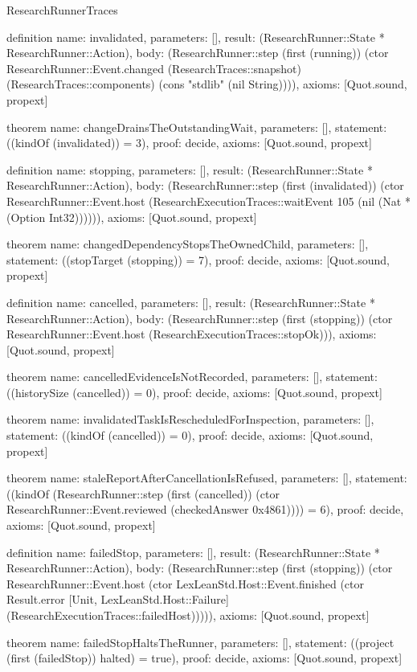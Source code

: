 \begin{lexlean}{ResearchRunnerTraces}
\begin{semanticmodule}
definition{
  name: invalidated,
  parameters: [],
  result: (ResearchRunner::State * ResearchRunner::Action),
  body: (ResearchRunner::step (first (running)) (ctor ResearchRunner::Event.changed (ResearchTraces::snapshot) (ResearchTraces::components) (cons "stdlib" (nil String)))),
  axioms: [Quot.sound, propext]
}

theorem{
  name: changeDrainsTheOutstandingWait,
  parameters: [],
  statement: ((kindOf (invalidated)) = 3),
  proof: decide{},
  axioms: [Quot.sound, propext]
}

definition{
  name: stopping,
  parameters: [],
  result: (ResearchRunner::State * ResearchRunner::Action),
  body: (ResearchRunner::step (first (invalidated)) (ctor ResearchRunner::Event.host (ResearchExecutionTraces::waitEvent 105 (nil (Nat * (Option Int32)))))),
  axioms: [Quot.sound, propext]
}

theorem{
  name: changedDependencyStopsTheOwnedChild,
  parameters: [],
  statement: ((stopTarget (stopping)) = 7),
  proof: decide{},
  axioms: [Quot.sound, propext]
}

definition{
  name: cancelled,
  parameters: [],
  result: (ResearchRunner::State * ResearchRunner::Action),
  body: (ResearchRunner::step (first (stopping)) (ctor ResearchRunner::Event.host (ResearchExecutionTraces::stopOk))),
  axioms: [Quot.sound, propext]
}

theorem{
  name: cancelledEvidenceIsNotRecorded,
  parameters: [],
  statement: ((historySize (cancelled)) = 0),
  proof: decide{},
  axioms: [Quot.sound, propext]
}

theorem{
  name: invalidatedTaskIsRescheduledForInspection,
  parameters: [],
  statement: ((kindOf (cancelled)) = 0),
  proof: decide{},
  axioms: [Quot.sound, propext]
}

theorem{
  name: staleReportAfterCancellationIsRefused,
  parameters: [],
  statement: ((kindOf (ResearchRunner::step (first (cancelled)) (ctor ResearchRunner::Event.reviewed (checkedAnswer 0x4861)))) = 6),
  proof: decide{},
  axioms: [Quot.sound, propext]
}

definition{
  name: failedStop,
  parameters: [],
  result: (ResearchRunner::State * ResearchRunner::Action),
  body: (ResearchRunner::step (first (stopping)) (ctor ResearchRunner::Event.host (ctor LexLeanStd.Host::Event.finished (ctor Result.error [Unit, LexLeanStd.Host::Failure] (ResearchExecutionTraces::failedHost))))),
  axioms: [Quot.sound, propext]
}

theorem{
  name: failedStopHaltsTheRunner,
  parameters: [],
  statement: ((project (first (failedStop)) halted) = true),
  proof: decide{},
  axioms: [Quot.sound, propext]
}


\end{semanticmodule}
\end{lexlean}
